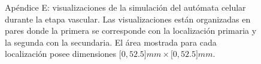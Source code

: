 \begin{appendixes}
\begin{figure}[!ht]
\begin{center}
    \end{center}\vspace*{-0.6cm}
    \caption[Ap\'endice E: visualizaciones de la simulaci\'on del aut\'omata celular durante la etapa vascular]{Ap\'endice E: visualizaciones de la simulaci\'on del aut\'omata celular durante la etapa vascular. Las visualizaciones est\'an organizadas en pares donde la primera se corresponde con la localizaci\'on primaria y la segunda con la secundaria. El \'area mostrada para cada localizaci\'on posee dimensiones $[0,52$.$5]mm \times [0,52$.$5]mm$.}
    \end{figure}
\end{appendixes}